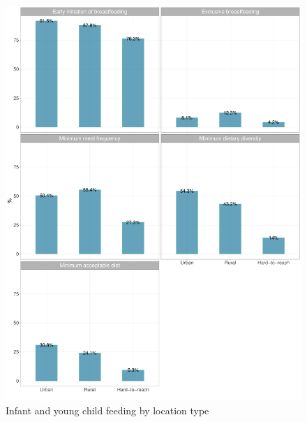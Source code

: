 \documentclass[12pt,a4paper]{article}
\begin{document}
\begin{figure}[H]

{\centering \includegraphics{kayahReport_files/figure-latex/iycf1plot-1} 

}

\caption{Infant and young child feeding by location type}\label{fig:iycf1plot}
\end{figure}
\end{document}
